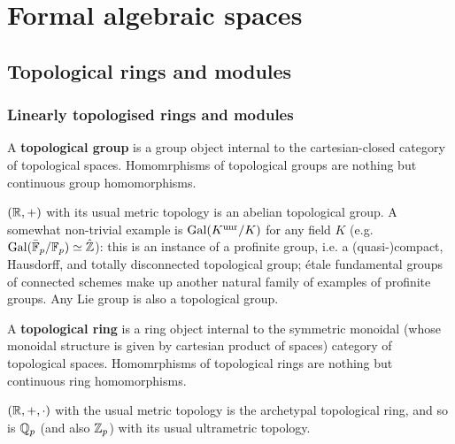 \section{Formal algebraic spaces}
    \subsection{Topological rings and modules}
        \subsubsection{Linearly topologised rings and modules}
            \begin{definition} \label{def: topological_rings}
                A \textbf{topological group} is a group object internal to the cartesian-closed category of topological spaces. Homomrphisms of topological groups are nothing but continuous group homomorphisms.
            \end{definition}
            \begin{example}
                $(\mathbb{R}, +)$ with its usual metric topology is an abelian topological group. A somewhat non-trivial example is $\mathrm{Gal}(K^{\mathrm{unr}}/K)$ for any field $K$ (e.g. $\mathrm{Gal}(\bar{\mathbb{F}}_p/\mathbb{F}_p) \simeq \hat{\mathbb{Z}}$): this is an instance of a profinite group, i.e. a (quasi-)compact, Hausdorff, and totally disconnected topological group; \'etale fundamental groups of connected schemes make up another natural family of examples of profinite groups. Any Lie group is also a topological group.
            \end{example}
            \begin{definition} \label{def: topological_rings}
                A \textbf{topological ring} is a ring object internal to the symmetric monoidal (whose monoidal structure is given by cartesian product of spaces) category of topological spaces. Homomrphisms of topological rings are nothing but continuous ring homomorphisms.
            \end{definition}
            \begin{example}
                $(\mathbb{R}, +, \cdot)$ with the usual metric topology is the archetypal topological ring, and so is $\mathbb{Q}_p$ (and also $\mathbb{Z}_p$) with its usual ultrametric topology.
            \end{example}
